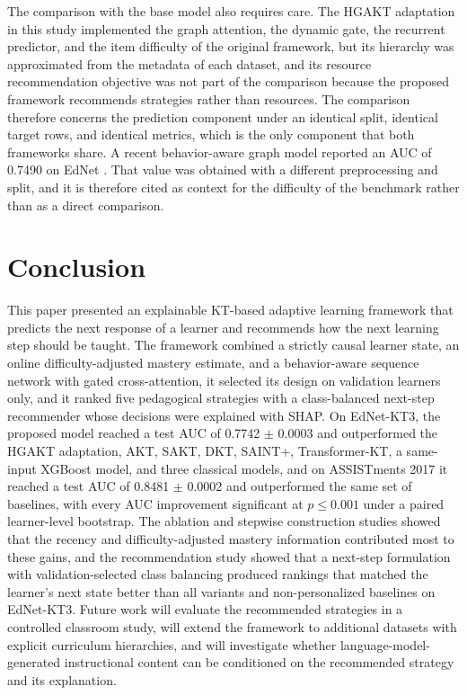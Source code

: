 \documentclass[11pt]{article}
\begin{document}
The comparison with the base model also requires care. The HGAKT adaptation in this study implemented the graph attention, the dynamic gate, the recurrent predictor, and the item difficulty of the original framework, but its hierarchy was approximated from the metadata of each dataset, and its resource recommendation objective was not part of the comparison because the proposed framework recommends strategies rather than resources. The comparison therefore concerns the prediction component under an identical split, identical target rows, and identical metrics, which is the only component that both frameworks share. A recent behavior-aware graph model reported an AUC of 0.7490 on EdNet \cite{wang2026knowledge}. That value was obtained with a different preprocessing and split, and it is therefore cited as context for the difficulty of the benchmark rather than as a direct comparison.

\section{Conclusion}\label{sec:conclusion}

This paper presented an explainable KT-based adaptive learning framework that predicts the next response of a learner and recommends how the next learning step should be taught. The framework combined a strictly causal learner state, an online difficulty-adjusted mastery estimate, and a behavior-aware sequence network with gated cross-attention, it selected its design on validation learners only, and it ranked five pedagogical strategies with a class-balanced next-step recommender whose decisions were explained with SHAP. On EdNet-KT3, the proposed model reached a test AUC of 0.7742 $\pm$ 0.0003 and outperformed the HGAKT adaptation, AKT, SAKT, DKT, SAINT+, Transformer-KT, a same-input XGBoost model, and three classical models, and on ASSISTments 2017 it reached a test AUC of 0.8481 $\pm$ 0.0002 and outperformed the same set of baselines, with every AUC improvement significant at $p \leq 0.001$ under a paired learner-level bootstrap. The ablation and stepwise construction studies showed that the recency and difficulty-adjusted mastery information contributed most to these gains, and the recommendation study showed that a next-step formulation with validation-selected class balancing produced rankings that matched the learner's next state better than all variants and non-personalized baselines on EdNet-KT3. Future work will evaluate the recommended strategies in a controlled classroom study, will extend the framework to additional datasets with explicit curriculum hierarchies, and will investigate whether language-model-generated instructional content can be conditioned on the recommended strategy and its explanation.
\end{document}
